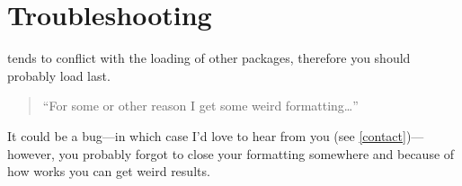 \documentclass[11pt, cm-default]{l3doc}
\begin{document}
	\section{Troubleshooting}
	 tends to conflict with the loading of other packages, therefore you should probably load  last.
	
	\begin{quotation}
		``For some or other reason I get some weird formatting\dots''
	\end{quotation}

	It could be a bug---in which case I'd love to hear from you (see \ref{contact})---however, you probably forgot to close your formatting somewhere and because of how  works you can get weird results.



	
	
	
\end{document}

